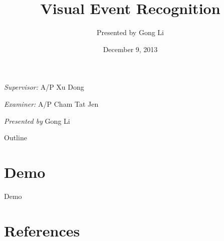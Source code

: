 \documentclass{beamer}
\title{Visual Event Recognition}
\author{Presented by Gong Li}
\date{December 9, 2013}
\begin{document}
\begin{frame}
	\maketitle

\begin{center}
\emph{Supervisor:}
A/P Xu Dong

\vspace{2 mm} 

\emph{Examiner:}
A/P Cham Tat Jen

\vspace{2 mm} 

\emph{Presented by}
Gong Li
\end{center}
\end{frame}





\begin{frame}{Outline}
\begin{multicols}{2}
  \tableofcontents
   \end{multicols}
\end{frame}



% 




\section{Demo}
\begin{frame}
	\begin{center}
	\Huge{Demo}
	\end{center}
\end{frame}

\section{References}


\end{document}
